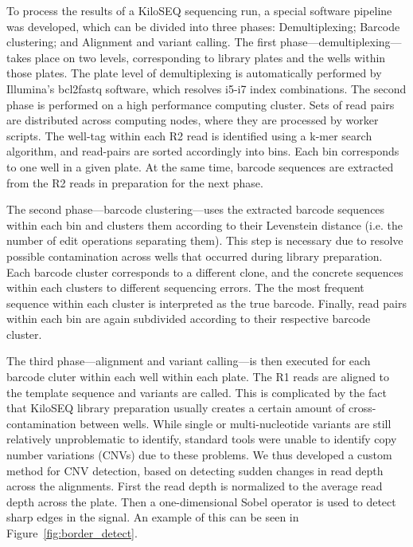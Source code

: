 To process the results of a KiloSEQ sequencing run, a special software pipeline was developed, which can be divided into three phases: Demultiplexing; Barcode clustering; and Alignment and variant calling.
The first phase---demultiplexing---takes place on two levels, corresponding to library plates and the wells within those plates. The plate level of demultiplexing is automatically performed by Illumina's bcl2fastq software, which resolves i5-i7 index combinations. The second phase is performed on a high performance computing cluster. Sets of read pairs are distributed across computing nodes, where they are processed by worker scripts. The well-tag within each R2 read is identified using a k-mer search algorithm, and read-pairs are sorted accordingly into bins. Each bin corresponds to one well in a given plate. At the same time, barcode sequences are extracted from the R2 reads in preparation for the next phase. 

The second phase---barcode clustering---uses the extracted barcode sequences within each bin and clusters them according to their Levenstein distance (i.e. the number of edit operations separating them). This step is necessary due to resolve possible contamination across wells that occurred during library preparation. Each barcode cluster corresponds to a different clone, and the concrete sequences within each clusters to different sequencing errors. The the most frequent sequence within each cluster is interpreted as the true barcode. Finally, read pairs within each bin are again subdivided according to their respective barcode cluster.

The third phase---alignment and variant calling---is then executed for each barcode cluter within each well within each plate. The R1 reads are aligned to the template sequence and variants are called. This is complicated by the fact that KiloSEQ library preparation usually creates a certain amount of cross-contamination between wells. While single or multi-nucleotide variants are still relatively unproblematic to identify, standard tools were unable to identify copy number variations (CNVs) due to these problems. We thus developed a custom method for CNV detection, based on detecting sudden changes in read depth across the alignments. First the read depth is normalized to the average read depth across the plate. Then a one-dimensional Sobel operator is used to detect sharp edges in the signal. An example of this can be seen in Figure~\ref{fig:border_detect}.


